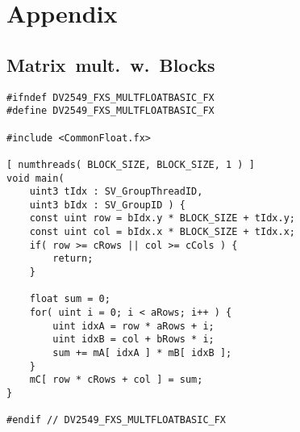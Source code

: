 \documentclass[fleqn,10pt]{SelfArx} %
\newlength{\tocsep}
\begin{document}


\newpage
\section*{Appendix}
\label{sec:appendix}
\subsection*{Matrix~mult.~w.~Blocks}
\begin{lstlisting}
#ifndef DV2549_FXS_MULTFLOATBASIC_FX
#define DV2549_FXS_MULTFLOATBASIC_FX

#include <CommonFloat.fx>

[ numthreads( BLOCK_SIZE, BLOCK_SIZE, 1 ) ]
void main(
	uint3 tIdx : SV_GroupThreadID,
	uint3 bIdx : SV_GroupID ) {
	const uint row = bIdx.y * BLOCK_SIZE + tIdx.y;
	const uint col = bIdx.x * BLOCK_SIZE + tIdx.x;
	if( row >= cRows || col >= cCols ) {
		return;
	}
        
	float sum = 0;
	for( uint i = 0; i < aRows; i++ ) {
		uint idxA = row * aRows + i;
		uint idxB = col + bRows * i;
		sum += mA[ idxA ] * mB[ idxB ];
	}
	mC[ row * cRows + col ] = sum;
}

#endif // DV2549_FXS_MULTFLOATBASIC_FX
\end{lstlisting}
\end{document}
